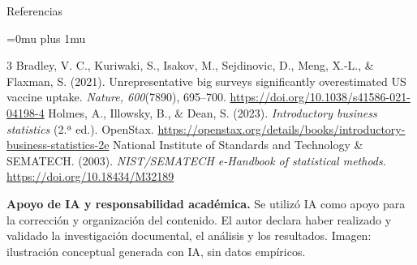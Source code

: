 \documentclass[spanish,final,xcolor={dvipsnames,table}]{beamer}
\begin{document}
\begin{itescaposter}
\begin{block}{Referencias}
\fontsize{9.5}{11.1}\selectfont{}\raggedright
{}\Urlmuskip=0mu plus 1mu\setlength{\emergencystretch}{2em}
\renewcommand{\bibsection}{}\setlength{\bibsep}{2pt}\setlength{\bibhang}{0.65cm}
\begin{thebibliography}{3}
Bradley, V. C., Kuriwaki, S., Isakov, M., Sejdinovic, D., Meng, X.-L., \& Flaxman, S. (2021). Unrepresentative big surveys significantly overestimated US vaccine uptake. \textit{Nature, 600}(7890), 695--700. \url{https://doi.org/10.1038/s41586-021-04198-4}
Holmes, A., Illowsky, B., \& Dean, S. (2023). \textit{Introductory business statistics} (2.ª ed.). OpenStax. \url{https://openstax.org/details/books/introductory-business-statistics-2e}
National Institute of Standards and Technology \& SEMATECH. (2003). \textit{NIST/SEMATECH e-Handbook of statistical methods}. \url{https://doi.org/10.18434/M32189}
\end{thebibliography}
\end{block}
{\fontsize{8}{9.5}\selectfont\raggedright
\textbf{Apoyo de IA y responsabilidad académica.} Se utilizó IA como apoyo para la corrección y organización del contenido. El autor declara haber realizado y validado la investigación documental, el análisis y los resultados. Imagen: ilustración conceptual generada con IA, sin datos empíricos.\par}
\end{itescaposter}
\end{document}
